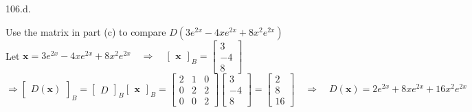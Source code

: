 \documentclass[12pt]{book}
\begin{document}
\begin{CJK}{UTF8}{bsmi}
106.d. \begin{minipage}[t]{\dimexpr\linewidth-2em}
Use the matrix in part (c) to compare $D(3e^{2x}-4xe^{2x}+8x^2e^{2x})$ \\
Let $\textbf{x}=3e^{2x}-4xe^{2x}+8x^2e^{2x}\quad\Rightarrow\quad\begin{bmatrix}
\textbf{x}
\end{bmatrix}_B=\begin{bmatrix}
3\\-4\\8
\end{bmatrix}$ \\
$\Rightarrow\begin{bmatrix}
D(\textbf{x})
\end{bmatrix}_B=\begin{bmatrix}
D
\end{bmatrix}_B\begin{bmatrix}
\textbf{x}
\end{bmatrix}_B=\begin{bmatrix}
2&1&0\\0&2&2\\0&0&2
\end{bmatrix}\begin{bmatrix}
3\\-4\\8
\end{bmatrix}=\begin{bmatrix}
2\\8\\16
\end{bmatrix}\quad\Rightarrow\quad D(\textbf{x})=2e^{2x}+8xe^{2x}+16x^2e^{2x}$
\end{minipage}\\

\end{CJK}
\end{document}
